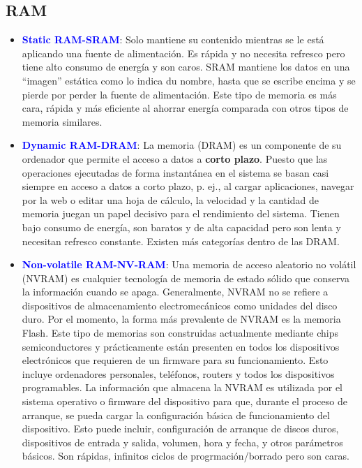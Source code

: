 \documentclass[
	12pt, %
	fleqn, %
	a4paper, %
]{LegrandOrangeBook}
\begin{document}
\subsection{RAM}
\begin{itemize}
\item \textbf{\textcolor{blue}{Static RAM-SRAM}}: Solo mantiene su contenido mientras se le está aplicando una fuente de alimentación. Es rápida y no necesita refresco pero tiene alto consumo de energía y son caros. SRAM mantiene los datos en una ``imagen'' estática como lo indica du nombre, hasta que se escribe encima y se pierde por perder la fuente de alimentación. Este tipo de memoria es más cara, rápida y más eficiente al ahorrar energía comparada con otros tipos de memoria similares.
\item \textbf{\textcolor{blue}{Dynamic RAM-DRAM}}: La memoria (DRAM) es un componente de su ordenador que permite el acceso a datos a \textbf{corto plazo}. Puesto que las operaciones ejecutadas de forma instantánea en el sistema se basan casi siempre en acceso a datos a corto plazo, p. ej., al cargar aplicaciones, navegar por la web o editar una hoja de cálculo, la velocidad y la cantidad de memoria juegan un papel decisivo para el rendimiento del sistema. Tienen bajo consumo de energía, son baratos y de alta capacidad pero son lenta y necesitan refresco constante. Existen más categorías dentro de las DRAM.
\item \textbf{\textcolor{blue}{Non-volatile RAM-NV-RAM}}: Una memoria de acceso aleatorio no volátil (NVRAM) es cualquier tecnología de memoria de estado sólido que conserva la información cuando se apaga. Generalmente, NVRAM no se refiere a dispositivos de almacenamiento electromecánicos como unidades del disco duro. Por el momento, la forma más prevalente de NVRAM es la memoria Flash. Este tipo de memorias son construidas actualmente mediante chips semiconductores y prácticamente están presenten en todos los dispositivos electrónicos que requieren de un firmware para su funcionamiento. Esto incluye ordenadores personales, teléfonos, routers y todos los dispositivos programables. La información que almacena la NVRAM es utilizada por el sistema operativo o firmware del dispositivo para que, durante el proceso de arranque, se pueda cargar la configuración básica de funcionamiento del dispositivo. Esto puede incluir, configuración de arranque de discos duros, dispositivos de entrada y salida, volumen, hora y fecha, y otros parámetros básicos. Son rápidas, infinitos ciclos de progrmación/borrado pero son caras.
\end{itemize}
\end{document}
